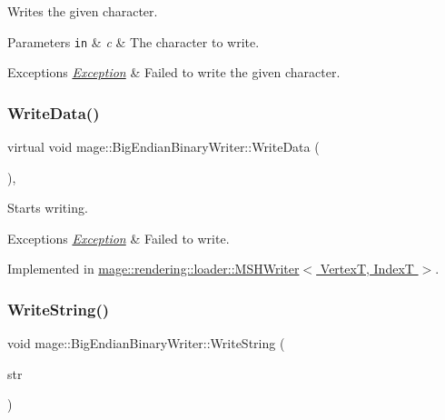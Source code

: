 Writes the given character.


\begin{DoxyParams}[1]{Parameters}
\mbox{\tt in}  & {\em c} & The character to write. \\
\hline
\end{DoxyParams}

\begin{DoxyExceptions}{Exceptions}
{\em \hyperlink{classmage_1_1_exception}{Exception}} & Failed to write the given character. \\
\hline
\end{DoxyExceptions}
\hypertarget{classmage_1_1_big_endian_binary_writer_a719581274b1b185ef05687183f7ded25}{}\label{classmage_1_1_big_endian_binary_writer_a719581274b1b185ef05687183f7ded25} 
\subsubsection{\texorpdfstring{Write\+Data()}{WriteData()}}
{\footnotesize\ttfamily virtual void mage\+::\+Big\+Endian\+Binary\+Writer\+::\+Write\+Data (\begin{DoxyParamCaption}{ }\end{DoxyParamCaption})\hspace{0.3cm}{\ttfamily [private]}, {}}

Starts writing.


\begin{DoxyExceptions}{Exceptions}
{\em \hyperlink{classmage_1_1_exception}{Exception}} & Failed to write. \\
\hline
\end{DoxyExceptions}


Implemented in \hyperlink{classmage_1_1rendering_1_1loader_1_1_m_s_h_writer_ad61ee7097e1bfb52ca9a0697d2cd6a7e}{mage\+::rendering\+::loader\+::\+M\+S\+H\+Writer$<$ Vertex\+T, Index\+T $>$}.

\hypertarget{classmage_1_1_big_endian_binary_writer_acf065a2e7462c9e6cf46849bd2c9d2e7}{}\label{classmage_1_1_big_endian_binary_writer_acf065a2e7462c9e6cf46849bd2c9d2e7} 
\subsubsection{\texorpdfstring{Write\+String()}{WriteString()}}
{\footnotesize\ttfamily void mage\+::\+Big\+Endian\+Binary\+Writer\+::\+Write\+String (\begin{DoxyParamCaption}\item[{\hyperlink{namespacemage_a8769f9d670d6b585ea306cb1062af94b}{Not\+Null}$<$ \hyperlink{namespacemage_abfd9206dc607ceb5d13ec68bf075a5c0}{const\+\_\+zstring} $>$}]{str }\end{DoxyParamCaption})\hspace{0.3cm}{\ttfamily [protected]}}

